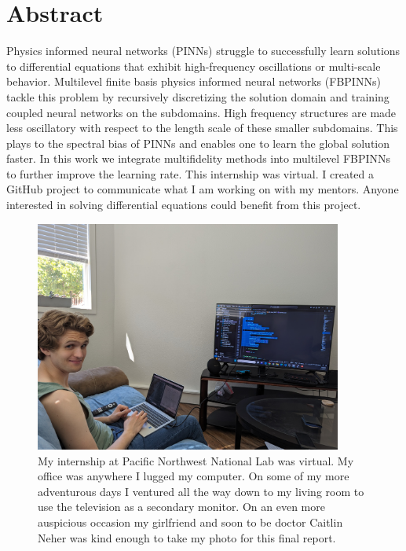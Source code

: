 \documentclass[12pt]{article}
\begin{document}
\section*{Abstract}
\begin{singlespace}
Physics informed neural networks (PINNs) struggle to successfully learn solutions to differential equations that exhibit high-frequency oscillations or multi-scale behavior. Multilevel finite basis physics informed neural networks (FBPINNs) tackle this problem by recursively discretizing the solution domain and training coupled neural networks on the subdomains. High frequency structures are made less oscillatory with respect to the length scale of these smaller subdomains. This plays to the spectral bias of PINNs and enables one to learn the global solution faster. In this work we integrate multifidelity methods into multilevel FBPINNs to further improve the learning rate. This internship was virtual. I created a GitHub project to communicate what I am working on with my mentors. Anyone interested in solving differential equations could benefit from this project.
\end{singlespace}
\vspace{1cm}
\begin{figure}[H]
\center
\includegraphics[width = 0.9\textwidth]{imgs/me.jpg}
\caption{My internship at Pacific Northwest National Lab was virtual. My office was anywhere I lugged my computer. On some of my more adventurous days I ventured all the way down to my living room to use the television as a secondary monitor. On an even more auspicious occasion my girlfriend and soon to be doctor Caitlin Neher was kind enough to take my photo for this final report.}
\end{figure}
\end{document}
